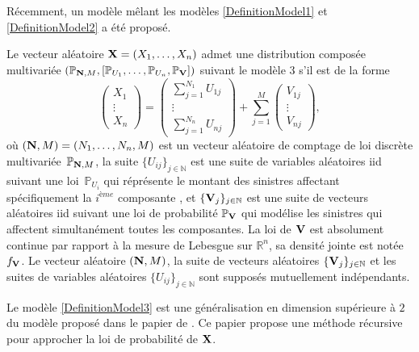 Récemment, un modèle mêlant les modèles \ref{DefinitionModel1} et \ref{DefinitionModel2} a été proposé.
\begin{Mod}\label{DefinitionModel3}
Le vecteur aléatoire $\bold{X}=(X_{1},\ldots,X_{n})$ admet une distribution composée multivariée $\left(\mathbb{P}_{\bold{N},M},\left[\mathbb{P}_{U_{1}},\ldots,\mathbb{P}_{U_{n}},\mathbb{P}_{\bold{V}}\right]\right)$ suivant le modèle $3$ s\rq{}il est de la forme  
\begin{equation}\label{MultivariateCompoundDistributionRV3}
\left( \begin{array}{l}
X_1 \\
\vdots\\
X_n \end{array}
\right)  =
 \displaystyle
\left( \begin{array}{l}
\sum_{j=1}^{N_{1}}U_{1j} \\
\vdots\\
\sum_{j=1}^{N_{n}}U_{nj} 
\end{array}
\right)
+
\sum_{j=1}^{M}
\left( \begin{array}{l}
V_{1j} \\
\vdots\\
V_{nj} 
\end{array}
\right)
,
\end{equation}
où $\left(\bold{N},M\right)=(N_{1},\ldots,N_{n},M)$ est un vecteur aléatoire de comptage de loi discrète multivariée $\,\mathbb{P}_{\bold{N},M}$, la suite $\{U_{ij}\}_{j\in\mathbb{N}}$ est une suite de variables aléatoires \gls{iid} suivant une loi $\,\mathbb{P}_{U_{i}}$ qui réprésente le montant des sinistres affectant spécifiquement la $i^{ème}$ composante , et $\{\bold{V}_{j}\}_{j\in\mathbb{N}}$ est une suite de vecteurs aléatoires \gls{iid} suivant une loi de probabilité $\mathbb{P}_{\bold{V}}$ qui modélise les sinistres qui affectent simultanément toutes les composantes. La loi de $\bold{V}$ est absolument continue par rapport à la mesure de Lebesgue sur $\mathbb{R}^{n}$, sa densité jointe est notée $f_{\bold{V}}$. Le vecteur aléatoire $\left(\bold{N},M\right)$, la suite de vecteurs aléatoires $\{\bold{V}_{j}\}_{j\in\mathbb{N}}$ et les suites de variables aléatoires $\{U_{ij}\}_{j\in\mathbb{N}}$ sont supposés mutuellement indépendants. 
\end{Mod}
Le modèle \ref{DefinitionModel3} est une généralisation en dimension supérieure à $2$ du modèle proposé dans le papier de \citet{JiRe14}. Ce papier propose une méthode récursive pour approcher la loi de probabilité de $\bold{X}$.\\

